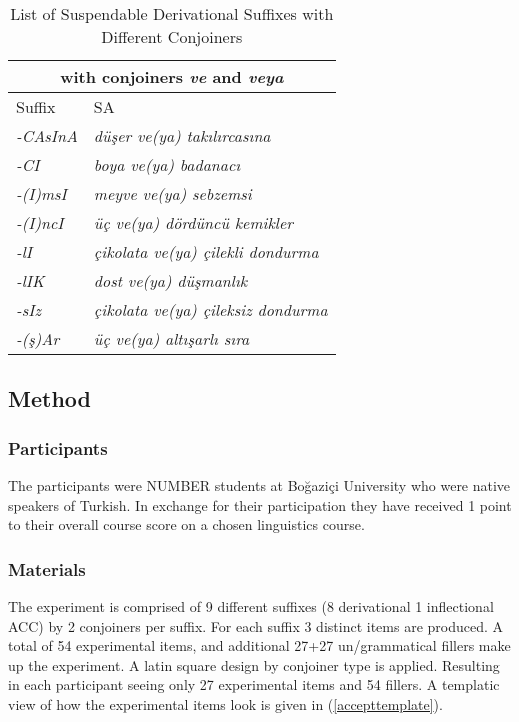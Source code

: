 \begin{table}[hbt!]
    \caption{List of Suspendable Derivational Suffixes with Different Conjoiners}
    \centering
    \begin{tabular}{|ll|}
    \hline
    \multicolumn{2}{|c|}{with conjoiners \textit{ve} and \textit{veya}}         \\
    \hline 
        Suffix                  & SA                                            \\
    \hline 
       \textit{-CAsInA}         & \textit{düşer ve(ya) takılırcasına}           \\
       \textit{-CI}             & \textit{boya ve(ya) badanacı}                 \\
       \textit{-(I)msI}         & \textit{meyve ve(ya) sebzemsi}                \\
       \textit{-(I)ncI}         & \textit{üç ve(ya) dördüncü kemikler}          \\
       \textit{-lI}             & \textit{çikolata ve(ya) çilekli dondurma}     \\
       \textit{-lIK}            & \textit{dost ve(ya) düşmanlık}                \\
       \textit{-sIz}            & \textit{çikolata ve(ya) çileksiz dondurma}    \\
       \textit{-(ş)Ar}          & \textit{üç ve(ya) altışarlı sıra}             \\
       \hline 
    \end{tabular}
    \label{tab:derivationalSA}
\end{table}

\subsection{Method}
\subsubsection{Participants}

The participants were NUMBER students at Boğaziçi University who were native speakers of Turkish. In exchange for their participation they have received 1 point to their overall course score on a chosen linguistics course.

\subsubsection{Materials}

The experiment is comprised of 9 different suffixes (8 derivational 1 inflectional ACC) by 2 conjoiners per suffix. For each suffix 3 distinct items are produced. A total of 54 experimental items, and additional 27+27 un/grammatical fillers make up the experiment. A latin square design by conjoiner type is applied. Resulting in each participant seeing only 27 experimental items and 54 fillers.  A templatic view of how the experimental items look is given in (\ref{accepttemplate}).

